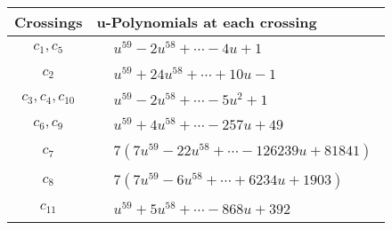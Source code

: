 \documentclass[1p]{elsarticle_modified}
\theoremstyle{definition}
\begin{document}
\begin{tabular}{m{50pt}|m{274pt}}
Crossings & \hspace{64pt}u-Polynomials at each crossing \\
\hline $$\begin{aligned}c_{1},c_{5}\end{aligned}$$&$\begin{aligned}
&u^{59}-2 u^{58}+\cdots-4 u+1
\end{aligned}$\\
\hline $$\begin{aligned}c_{2}\end{aligned}$$&$\begin{aligned}
&u^{59}+24 u^{58}+\cdots+10 u-1
\end{aligned}$\\
\hline $$\begin{aligned}c_{3},c_{4},c_{10}\end{aligned}$$&$\begin{aligned}
&u^{59}-2 u^{58}+\cdots-5 u^2+1
\end{aligned}$\\
\hline $$\begin{aligned}c_{6},c_{9}\end{aligned}$$&$\begin{aligned}
&u^{59}+4 u^{58}+\cdots-257 u+49
\end{aligned}$\\
\hline $$\begin{aligned}c_{7}\end{aligned}$$&$\begin{aligned}
&7(7 u^{59}-22 u^{58}+\cdots-126239 u+81841)
\end{aligned}$\\
\hline $$\begin{aligned}c_{8}\end{aligned}$$&$\begin{aligned}
&7(7 u^{59}-6 u^{58}+\cdots+6234 u+1903)
\end{aligned}$\\
\hline $$\begin{aligned}c_{11}\end{aligned}$$&$\begin{aligned}
&u^{59}+5 u^{58}+\cdots-868 u+392
\end{aligned}$\\
\hline
\end{tabular}\\~\\
\newpage\renewcommand{\arraystretch}{1}
\end{document}

